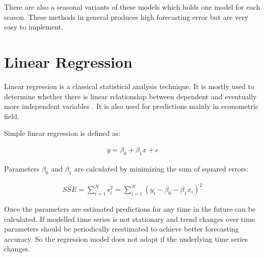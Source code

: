     There are also a seasonal variants of these models which holds one model for each season. These methods in general
     produces high forecasting error but are very easy to implement.

    \section{Linear Regression} \label{sec:linear-regression}
    Linear regression is a classical statistical analysis technique. It is mostly used to determine whether there is
    linear relationship between dependent and eventually more independent variables \cite{cipra}. It is also used for
    predictions mainly in econometric field.

    Simple linear regression is defined as:

    \begin{eqnarray} \label{eq:linear-regression}
        y = \beta_0 + \beta_1 x + \epsilon
    \end{eqnarray}

    Parameters $\beta_0$ and $\beta_1$ are calculated by minimizing the sum of squared errors:
    
    \begin{eqnarray} \label{eq:linear-regression-estimation}
        SSE = \sum_{i=1}^N \epsilon_{i}^2 = \sum_{i=1}^N (y_i - \beta_0 - \beta_1 x_i)^2
    \end{eqnarray}
    
    Once the parameters are estimated predictions for any time in the future can be calculated. If modelled time
    series is not stationary and trend changes over time parameters should be periodically reestimated to achieve
    better forecasting accuracy. So the regression model does not adapt if the underlying time series changes.


